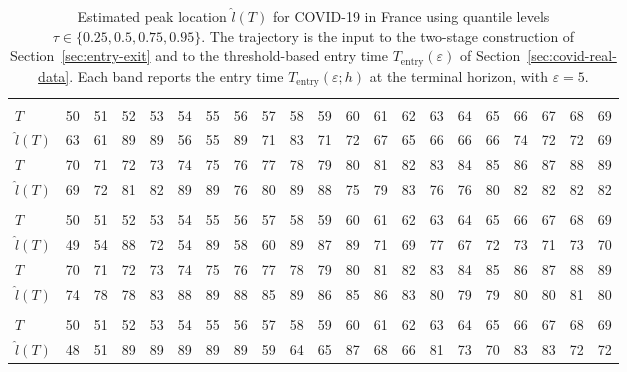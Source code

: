 \documentclass[12pt,a4paper]{article}
\begin{document}
\begin{table}
	\caption{Estimated peak location $\hat{l}(T)$ for COVID-19 in France using quantile levels $\tau\in\{0.25,0.5,0.75,0.95\}$. The trajectory is the input to the two-stage construction of Section~\ref{sec:entry-exit} and to the threshold-based entry time $T_{\mathrm{entry}}(\varepsilon)$ of Section~\ref{sec:covid-real-data}. Each band reports the entry time $T_{\mathrm{entry}}(\varepsilon;h)$ at the terminal horizon, with $\varepsilon=5$.}
	\label{tab:france_tau}
	\begin{tabular*}{\textheight}{@{\extracolsep{\fill}}lrrrrrrrrrrrrrrrrrrrr}
		\toprule
		\addlinespace[2.5pt]
		\multicolumn{21}{c}{\textbf{$\tau=0.25,\ T_{\mathrm{entry}}(5)=85$}} \\
		\addlinespace[2.5pt]
		\midrule
		$T$ & 50 & 51 & 52 & 53 & 54 & 55 & 56 & 57 & 58 & 59 & 60 & 61 & 62 & 63 & 64 & 65 & 66 & 67 & 68 & 69 \\
		$\hat{l}(T)$ & 63 & 61 & 89 & 89 & 56 & 55 & 89 & 71 & 83 & 71 & 72 & 67 & 65 & 66 & 66 & 66 & 74 & 72 & 72 & 69 \\
		$T$ & 70 & 71 & 72 & 73 & 74 & 75 & 76 & 77 & 78 & 79 & 80 & 81 & 82 & 83 & 84 & 85 & 86 & 87 & 88 & 89 \\
		$\hat{l}(T)$ & 69 & 72 & 81 & 82 & 89 & 89 & 76 & 80 & 89 & 88 & 75 & 79 & 83 & 76 & 76 & 80 & 82 & 82 & 82 & 82 \\
		\midrule\addlinespace[2.5pt]
		\multicolumn{21}{c}{\textbf{$\tau=0.5,\ T_{\mathrm{entry}}(5)=82$}} \\
		\addlinespace[2.5pt]
		\midrule
		$T$ & 50 & 51 & 52 & 53 & 54 & 55 & 56 & 57 & 58 & 59 & 60 & 61 & 62 & 63 & 64 & 65 & 66 & 67 & 68 & 69 \\
		$\hat{l}(T)$ & 49 & 54 & 88 & 72 & 54 & 89 & 58 & 60 & 89 & 87 & 89 & 71 & 69 & 77 & 67 & 72 & 73 & 71 & 73 & 70 \\
		$T$ & 70 & 71 & 72 & 73 & 74 & 75 & 76 & 77 & 78 & 79 & 80 & 81 & 82 & 83 & 84 & 85 & 86 & 87 & 88 & 89 \\
		$\hat{l}(T)$ & 74 & 78 & 78 & 83 & 88 & 89 & 88 & 85 & 89 & 86 & 85 & 86 & 83 & 80 & 79 & 79 & 80 & 80 & 81 & 80 \\
		\midrule\addlinespace[2.5pt]
		\multicolumn{21}{c}{\textbf{$\tau=0.75,\ T_{\mathrm{entry}}(5)=80$}} \\
		\addlinespace[2.5pt]
		\midrule
		$T$ & 50 & 51 & 52 & 53 & 54 & 55 & 56 & 57 & 58 & 59 & 60 & 61 & 62 & 63 & 64 & 65 & 66 & 67 & 68 & 69 \\
		$\hat{l}(T)$ & 48 & 51 & 89 & 89 & 89 & 89 & 89 & 59 & 64 & 65 & 87 & 68 & 66 & 81 & 73 & 70 & 83 & 83 & 72 & 72 \\

\end{tabular*}
\end{table}
\end{document}
